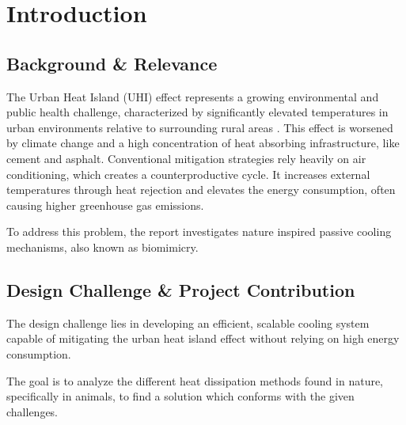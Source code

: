\section{Introduction}
\label{sec:intro}

\subsection{Background \& Relevance}
\label{sec:background}

The Urban Heat Island (UHI) effect represents a growing environmental and public health
challenge, characterized by significantly elevated temperatures in urban environments
relative to surrounding rural areas \cite{yang2016}. This effect is worsened by climate
change and a high concentration of heat absorbing infrastructure, like cement and asphalt.
Conventional mitigation strategies rely heavily on air conditioning, which creates a
counterproductive cycle. It increases external temperatures through heat rejection and
elevates the energy consumption, often causing higher greenhouse gas emissions. \cite{jin2020}

To address this problem, the report investigates nature inspired passive cooling
mechanisms, also known as biomimicry.

\subsection{Design Challenge \& Project Contribution}
\label{sec:contribution}

The design challenge lies in developing an efficient, scalable cooling system capable of
mitigating the urban heat island effect without relying on high energy consumption.

The goal is to analyze the different heat dissipation methods found in nature,
specifically in animals, to find a solution which conforms with the given challenges.
